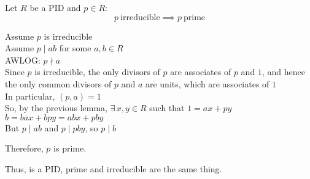 \documentclass[letterpaper,12pt,fleqn]{article}
\begin{document}
\begin{theorem}
  Let $R$ be a PID and $p\in R$:
  \[p\ \mbox{irreducible}\implies p\ \mbox{prime}\]
\end{theorem}

\begin{theproof}
  Assume $p$ is irreducible \\
  Assume $p\mid ab$ for some $a,b\in R$ \\
  AWLOG: $p\nmid a$ \\
  Since $p$ is irreducible, the only divisors of $p$ are associates of $p$ and
  $1$, and hence the only common divisors of $p$ and $a$ are units, which are
  associates of $1$ \\
  In particular, $(p,a)=1$ \\
  So, by the previous lemma, $\exists\,x,y\in R$ such that $1=ax+py$ \\
  $b=bax+bpy=abx+pby$ \\
  But $p\mid ab$ and $p\mid pby$, so $p\mid b$

  Therefore, $p$ is prime.
\end{theproof}

Thus, is a PID, prime and irreducible are the same thing.
\end{document}
